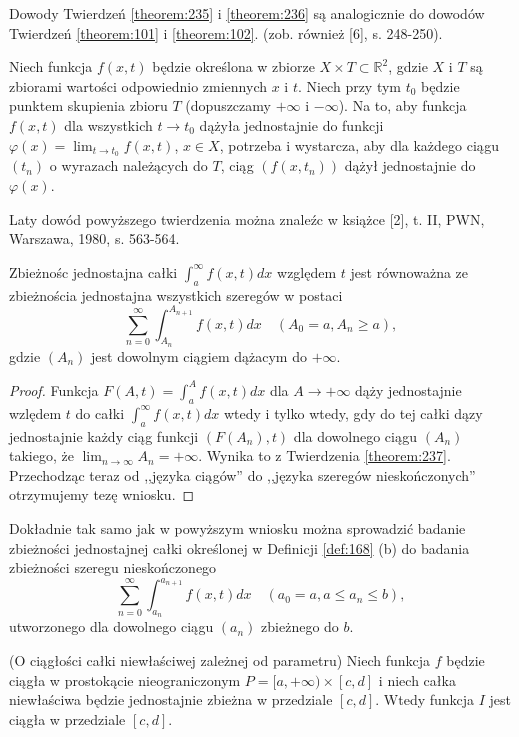 \documentclass[leqno]{article}
\begin{document}
\begin{justify}
Dowody Twierdzeń \ref{theorem:235} i \ref{theorem:236} są analogicznie do dowodów Twierdzeń \ref{theorem:101} i \ref{theorem:102}.
(zob. również [6], s. 248-250).

\begin{theorem}
{
    Niech funkcja $f(x,t)$ będzie określona w zbiorze $X \times T \subset \mathbb{R}^2$, gdzie $X$ i $T$ są zbiorami wartości 
    odpowiednio zmiennych $x$ i $t$. Niech przy tym $t_0$ będzie punktem skupienia zbioru $T$ (dopuszczamy $+\infty$ i $-\infty$).
    Na to, aby funkcja $f(x,t)$ dla wszystkich $t \to t_0$ dążyła jednostajnie do funkcji $\varphi(x) = \lim_{t \to t_0}f(x,t)$, $x \in X$,
    potrzeba i wystarcza, aby dla każdego ciągu $(t_n)$ o wyrazach należących do $T$, ciąg $(f(x, t_n))$ dążył jednostajnie do $\varphi(x)$. 
}
\end{theorem}

Laty dowód powyższego twierdzenia można znaleźc w książce [2], t. II, PWN, Warszawa, 1980, s. 563-564.

\begin{wniosek}
    Zbieżnośc jednostajna całki $\int_{a}^{\infty}f(x,t)dx$ względem $t$ jest równoważna ze zbieżnościa jednostajna wszystkich szeregów w postaci
    \[
        \sum_{n=0}^{\infty}\int_{A_n}^{A_{n+1}}f(x,t)dx \quad (A_0 = a, A_n \geqslant a),
    \]
    gdzie $(A_n)$ jest dowolnym ciągiem dążacym do $+\infty$.
\end{wniosek}

\begin{proof}
    Funkcja $F(A,t) = \int_{a}^{A}f(x,t)dx$ dla $A \to +\infty$ dąży jednostajnie wzlędem $t$ do całki $\int_{a}^{\infty}f(x,t)dx$ wtedy i tylko
    wtedy, gdy do tej całki dązy jednostajnie każdy ciąg funkcji $(F(A_n),t)$ dla dowolnego ciągu $(A_n)$ takiego, że $\lim_{n \to \infty}A_n = +\infty$.
    Wynika to z Twierdzenia \ref{theorem:237}. Przechodząc teraz od ,,języka ciągów'' do ,,języka szeregów nieskończonych'' otrzymujemy tezę wniosku.
\end{proof}

Dokładnie tak samo jak w powyższym wniosku można sprowadzić badanie zbieżności jednostajnej całki określonej w Definicji \ref{def:168} (b)
do badania zbieżności szeregu nieskończonego 
\[
    \sum_{n=0}^{\infty}\int_{a_n}^{a_{n+1}}f(x,t)dx \quad (a_0 = a, a \leqslant a_n \leqslant b),
\]
utworzonego dla dowolnego ciągu $(a_n)$ zbieżnego do $b$.

\begin{theorem}
{
    (O ciągłości całki niewłaściwej zależnej od parametru)
    Niech funkcja $f$ będzie ciągła w prostokącie nieograniczonym $P = [a, +\infty) \times [c,d]$ i niech 
    całka niewłaściwa będzie jednostajnie zbieżna w przedziale $[c,d]$. Wtedy funkcja $I$ jest ciągła w przedziale $[c,d]$.
}
\end{theorem}


\end{justify}
\end{document}
